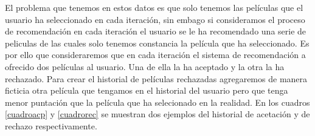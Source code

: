 El problema que tenemos en estos datos es que solo tenemos las películas que el usuario ha seleccionado en cada iteración, sin embago si consideramos el proceso de recomendación en cada iteración el usuario se le ha recomendado una serie de peliculas de las cuales solo tenemos constancia la película que ha seleccionado. Es por ello que consideraremos que en cada iteración el sistema de recomendación a ofrecido dos películas al usuario. Una de ella la ha aceptado y la otra la ha rechazado. Para crear el historial de películas rechazadas agregaremos de manera ficticia otra película que tengamos en el historial del usuario pero que tenga menor puntación que la película que ha selecionado en la realidad. En los cuadros \ref{cuadroacp} y \ref{cuadrorec} se muestran dos ejemplos del historial de acetación y de rechazo respectivamente. 

